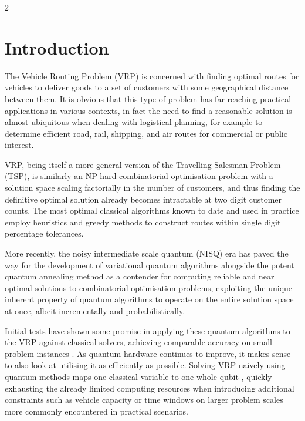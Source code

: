 \documentclass [10pt]{article}
\begin{document}
\begin {multicols}{2}

%

\section {Introduction}
The Vehicle Routing Problem (VRP) is concerned with finding optimal routes
for vehicles to deliver goods to a set of customers with some geographical
distance between them. It is obvious that this type of problem has far
reaching practical applications in various contexts, in fact the need to find
a reasonable solution is almost ubiquitous when dealing with logistical
planning, for example to determine efficient road, rail, shipping, and air
routes for commercial or public interest.

VRP, being itself a more general version of the Travelling Salesman Problem
(TSP), is similarly an NP hard \cite{vrp} combinatorial optimisation problem
with a solution space scaling factorially in the number of customers, and thus
finding the definitive optimal solution already becomes intractable at
two digit customer counts. The most optimal classical algorithms known to date
and used in practice employ heuristics and greedy methods to construct routes
within single digit percentage tolerances.

More recently, the noisy intermediate scale quantum (NISQ) era \cite{nisq} has
paved the way for the development of variational quantum algorithms alongside
the potent quantum annealing \cite{annealintro} method as a contender for
computing reliable and near optimal solutions to combinatorial optimisation
problems, exploiting the unique inherent property of quantum algorithms to
operate on the entire solution space at once, albeit incrementally and
probabilistically.

Initial tests have shown some promise in applying these quantum algorithms
to the VRP against classical solvers, achieving comparable accuracy on
small problem instances \cite{cvrpanneal} \cite{effvrp}.
As quantum hardware continues to improve, it makes
sense to also look at utilising it as efficiently as possible. Solving VRP
naively using quantum methods maps one classical variable to one whole qubit
\cite{effvrp},
quickly exhausting the already limited computing resources when introducing
additional constraints such as vehicle capacity or time windows on larger
problem scales more commonly encountered in practical scenarios.


\end{multicols}
\end{document}
